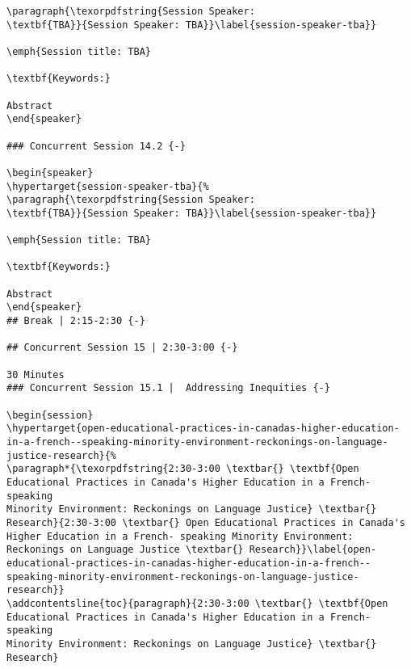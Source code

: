 \documentclass[
]{book}
\begin{document}
\begin{verbatim}
\paragraph{\texorpdfstring{Session Speaker:
\textbf{TBA}}{Session Speaker: TBA}}\label{session-speaker-tba}}

\emph{Session title: TBA}

\textbf{Keywords:}

Abstract
\end{speaker}

### Concurrent Session 14.2 {-}

\begin{speaker}
\hypertarget{session-speaker-tba}{%
\paragraph{\texorpdfstring{Session Speaker:
\textbf{TBA}}{Session Speaker: TBA}}\label{session-speaker-tba}}

\emph{Session title: TBA}

\textbf{Keywords:}

Abstract
\end{speaker}
## Break | 2:15-2:30 {-}

## Concurrent Session 15 | 2:30-3:00 {-}

30 Minutes
### Concurrent Session 15.1 |  Addressing Inequities {-}

\begin{session}
\hypertarget{open-educational-practices-in-canadas-higher-education-in-a-french--speaking-minority-environment-reckonings-on-language-justice-research}{%
\paragraph*{\texorpdfstring{2:30-3:00 \textbar{} \textbf{Open
Educational Practices in Canada's Higher Education in a French- speaking
Minority Environment: Reckonings on Language Justice} \textbar{}
Research}{2:30-3:00 \textbar{} Open Educational Practices in Canada's Higher Education in a French- speaking Minority Environment: Reckonings on Language Justice \textbar{} Research}}\label{open-educational-practices-in-canadas-higher-education-in-a-french--speaking-minority-environment-reckonings-on-language-justice-research}}
\addcontentsline{toc}{paragraph}{2:30-3:00 \textbar{} \textbf{Open
Educational Practices in Canada's Higher Education in a French- speaking
Minority Environment: Reckonings on Language Justice} \textbar{}
Research}


\end{verbatim}
\end{document}
